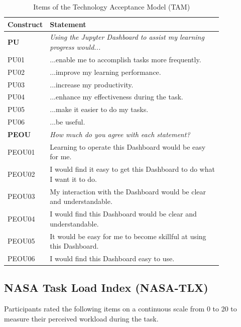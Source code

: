 \begin{table}[htpb]
  \centering
  \caption{Items of the Technology Acceptance Model (TAM)}
  \label{tab:app_tam}
  \begin{tabular}{lp{0.85\linewidth}}
    \toprule
    \textbf{Construct} & \textbf{Statement} \\
    \midrule
    \textbf{PU} & \textit{Using the Jupyter Dashboard to assist my learning progress would...} \\
    PU01 & ...enable me to accomplish tasks more frequently. \\
    PU02 & ...improve my learning performance. \\
    PU03 & ...increase my productivity. \\
    PU04 & ...enhance my effectiveness during the task. \\
    PU05 & ...make it easier to do my tasks. \\
    PU06 & ...be useful. \\
    \midrule
    \textbf{PEOU} & \textit{How much do you agree with each statement?} \\
    PEOU01 & Learning to operate this Dashboard would be easy for me. \\
    PEOU02 & I would find it easy to get this Dashboard to do what I want it to do. \\
    PEOU03 & My interaction with the Dashboard would be clear and understandable. \\
    PEOU04 & I would find this Dashboard would be clear and understandable. \\
    PEOU05 & It would be easy for me to become skillful at using this Dashboard. \\
    PEOU06 & I would find this Dashboard easy to use. \\
    \bottomrule
  \end{tabular}
\end{table}

\subsection{NASA Task Load Index (NASA-TLX)}
Participants rated the following items on a continuous scale from 0 to 20 to measure their perceived workload during the task.

